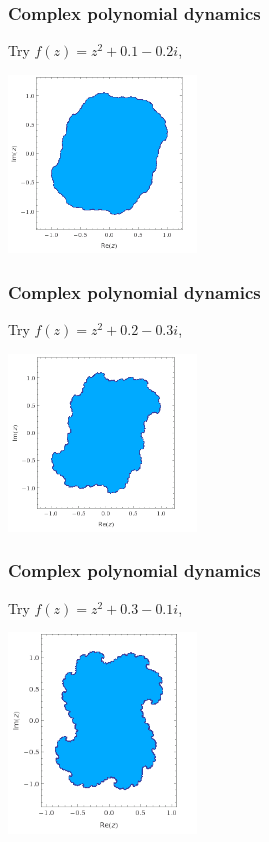 \documentclass{beamer} %
\theoremstyle{definition} %
\begin{document}
\begin{frame}\frametitle{Complex polynomial dynamics}
    Try $f(z) = z^2+0.1-0.2i$,\\
    \begin{center}
        \includegraphics[width=50mm]{img/julia01-02-filled.png}
    \end{center}
\end{frame}

\begin{frame}\frametitle{Complex polynomial dynamics}
    Try $f(z) = z^2+0.2-0.3i$,\\
    \begin{center}
        \includegraphics[width=50mm]{img/julia02-03-filled.png}
    \end{center}
\end{frame}

\begin{frame}\frametitle{Complex polynomial dynamics}
    Try $f(z) = z^2+0.3-0.1i$,\\
    \begin{center}
        \includegraphics[width=50mm]{img/julia03-01-filled.png}
    \end{center}
\end{frame}
\end{document}
